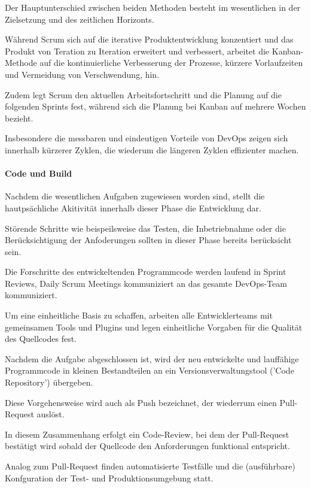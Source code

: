 Der Hauptunterschied zwischen beiden Methoden besteht im wesentlichen in der Zielsetzung und des zeitlichen Horizonts. 

Während Scrum sich auf die iterative Produktentwicklung konzentiert und das Produkt von Teration zu Iteration erweitert und verbessert, arbeitet die Kanban-Methode auf die kontinuierliche Verbesserung der Prozesse, kürzere Vorlaufzeiten und Vermeidung von Verschwendung, hin. \cite{concas_agile_2007}

Zudem legt Scrum den aktuellen Arbeitsfortschritt und die Planung auf die folgenden Sprints fest, während sich die Planung bei Kanban auf mehrere Wochen bezieht. \cite[s. 5]{verona_practical_2016} 

Insbesondere die messbaren und eindeutigen Vorteile von DevOps zeigen sich innerhalb kürzerer Zyklen, die wiederum die längeren Zyklen effizienter machen. 

\paragraph{Code und Build}

Nachdem die wesentlichen Aufgaben zugewiesen worden sind, stellt die hautpsächliche Akitivität innerhalb dieser Phase die Entwicklung dar. 

Störende Schritte wie beispeilsweise das Testen, die Inbetriebnahme oder die Berücksichtigung der Anfoderungen sollten in dieser Phase bereits berücksicht sein. \cite[S. 18]{halstenberg_devops_2020}  

Die Forschritte des entwickeltenden Programmcode werden laufend in Sprint Reviews, Daily Scrum Meetings kommuniziert an das gesamte DevOps-Team kommuniziert. 

Um eine einheitliche Basis zu schaffen, arbeiten alle Entwicklerteams mit gemeinsamen Tools und Plugins und legen einheitliche Vorgaben für die Qualität des Quellcodes fest. 

Nachdem die Aufgabe abgeschlossen ist, wird der neu entwickelte und lauffähige Programmcode in kleinen Bestandteilen an ein Versionsverwaltungstool ('Code Repository') übergeben.\cite[S. 18]{halstenberg_devops_2020}  

Diese Vorgehensweise wird auch als Push bezeichnet, der wiederrum einen Pull-Request auslöst. 

In diesem Zusammenhang erfolgt ein Code-Review, bei dem der Pull-Request bestätigt wird sobald der Quellcode den Anforderungen funktional entspricht.

Analog zum Pull-Request finden automatisierte Testfälle und die (ausführbare) Konfguration der Test- und Produktionsumgebung statt. \cite[S. 18]{halstenberg_devops_2020}  

